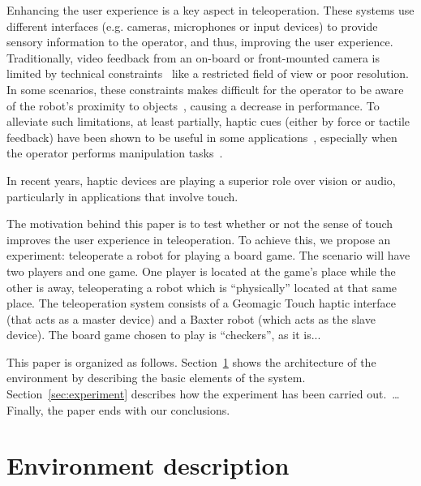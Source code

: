 \documentclass[journal,twoside]{JoPhA}
\begin{document}
  Enhancing the user experience is a key aspect in teleoperation. These systems use different interfaces (e.g. cameras, microphones or input devices) to provide sensory information to the operator, and thus, improving the user experience. Traditionally, video feedback from an on-board or front-mounted camera is limited by technical constraints~\cite{Woods04,Woods97} like a restricted field of view or poor resolution. In some scenarios, these constraints makes difficult for the operator to be aware of the robot's proximity to objects~\cite{Alfano90}, causing a decrease in performance. To alleviate such limitations, at least partially, haptic cues (either by force or tactile feedback) have been shown to be useful in some applications~\cite{Son13,Sitti03,Diolaiti02}, especially when the operator performs manipulation tasks~\cite{King09,Kron04}.
  
  In recent years, haptic devices are playing a superior role over vision or audio, particularly in applications that involve touch.%


  The motivation behind this paper is to test whether or not the sense of touch improves the user experience in teleoperation. To achieve this, we propose an experiment: teleoperate a robot for playing a board game. The scenario will have two players and one game. One player is located at the game's place while the other is away, teleoperating a robot which is ``physically'' located at that same place. The teleoperation system consists of a Geomagic Touch haptic interface (that acts as a master device) and a Baxter robot (which acts as the slave device). The board game chosen to play is ``checkers'', as it is...

  This paper is organized as follows. Section~\ref{sec:environment} shows the architecture of the environment by describing the basic elements of the system. Section~\ref{sec:experiment} describes how the experiment has been carried out.~\ldots Finally, the paper ends with our conclusions.

\section{Environment description}
\label{sec:environment}


\end{document}
